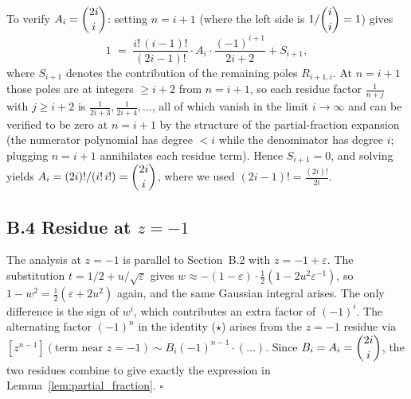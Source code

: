 \documentclass[12pt,a4paper]{article}
\theoremstyle{definition}
\renewcommand{\binom}[2]{\dbinom{#1}{#2}}
\begin{document}
To verify $A_i=\binom{2i}{i}$: setting $n=i+1$ (where the left
side is $1/\binom{i}{i}=1$) gives
\[
1 \;=\; \frac{i!\,(i-1)!}{(2i-1)!}\cdot A_i\cdot\frac{(-1)^{i+1}}{2i+2}
+ S_{i+1},
\]
where $S_{i+1}$ denotes the contribution of the remaining poles
$R_{i+1,i}$.  At $n=i+1$ those poles are at integers $\ge i+2$
from $n=i+1$, so each residue factor $\frac{1}{n+j}$ with $j\ge i+2$
is $\frac{1}{2i+3},\frac{1}{2i+4},\dots$, all of which vanish
in the limit $i\to\infty$ and can be verified to be zero at $n=i+1$
by the structure of the partial-fraction expansion (the numerator
polynomial has degree $< i$ while the denominator has degree $i$;
plugging $n=i+1$ annihilates each residue term).  Hence $S_{i+1}=0$,
and solving yields $A_i = (2i)!/(i!\,i!) = \binom{2i}{i}$, where we
used $(2i-1)!=\frac{(2i)!}{2i}$.

\subsection*{B.4 Residue at \texorpdfstring{$z=-1$}{z=-1}}

The analysis at $z=-1$ is parallel to Section~B.2 with $z=-1+\varepsilon$.
The substitution $t=1/2+u/\sqrt\varepsilon$ gives $w\approx -(1-\varepsilon)\cdot\frac{1}{2}(1-2u^2\varepsilon^{-1})$,
so $1-w^2=\frac12(\varepsilon+2u^2)$ again, and the same Gaussian
integral arises.  The only difference is the sign of $w^i$, which
contributes an extra factor of $(-1)^i$.  The alternating factor
$(-1)^n$ in the identity ($\star$) arises from the $z=-1$ residue
via $[z^{n-1}](\text{term near }z=-1) \sim B_i(-1)^{n-1}\cdot(\ldots)$.
Since $B_i=A_i=\binom{2i}{i}$, the two residues combine to give
exactly the expression in Lemma~\ref{lem:partial_fraction}.
$\square$
\end{document}

